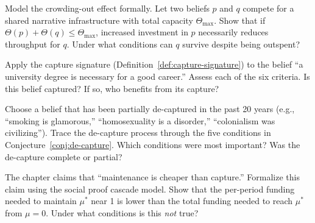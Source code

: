 \begin{exercise}
\label{ex:ch8-crowding}
Model the crowding-out effect formally.
Let two beliefs $p$ and $q$ compete for a shared narrative infrastructure with total capacity $\Theta_{\max}$.
Show that if $\Theta(p) + \Theta(q) \leq \Theta_{\max}$, increased investment in $p$ necessarily reduces throughput for $q$.
Under what conditions can $q$ survive despite being outspent?
\end{exercise}

\begin{exercise}
Apply the capture signature (Definition~\ref{def:capture-signature}) to the belief ``a university degree is necessary for a good career.''
Assess each of the six criteria.
Is this belief captured?
If so, who benefits from its capture?
\end{exercise}

\begin{exercise}
\label{ex:ch8-de-capture}
Choose a belief that has been partially de-captured in the past 20 years (e.g., ``smoking is glamorous,'' ``homosexuality is a disorder,'' ``colonialism was civilizing'').
Trace the de-capture process through the five conditions in Conjecture~\ref{conj:de-capture}.
Which conditions were most important?
Was the de-capture complete or partial?
\end{exercise}

\begin{exercise}
The chapter claims that ``maintenance is cheaper than capture.''
Formalize this claim using the social proof cascade model.
Show that the per-period funding needed to maintain $\mu^*$ near 1 is lower than the total funding needed to reach $\mu^*$ from $\mu = 0$.
Under what conditions is this \emph{not} true?
\end{exercise}
